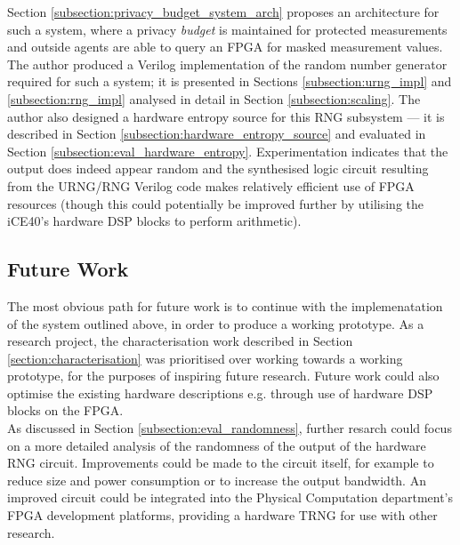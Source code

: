 \documentclass[12pt]{article}
\begin{document}
  Section \ref{subsection:privacy_budget_system_arch} proposes an architecture for such a system, where a privacy \textit{budget} is maintained for protected measurements and outside agents are able to query an FPGA for masked measurement values. The author produced a Verilog implementation of the random number generator required for such a system; it is presented in Sections \ref{subsection:urng_impl} and \ref{subsection:rng_impl} analysed in detail in Section \ref{subsection:scaling}. The author also designed a hardware entropy source for this RNG subsystem --- it is described in Section \ref{subsection:hardware_entropy_source} and evaluated in Section \ref{subsection:eval_hardware_entropy}. Experimentation indicates that the output does indeed appear random and the synthesised logic circuit resulting from the URNG/RNG Verilog code makes relatively efficient use of FPGA resources (though this could potentially be improved further by utilising the iCE40's hardware DSP blocks to perform arithmetic).


  \subsection{Future Work}
    The most obvious path for future work is to continue with the implemenatation of the system outlined above, in order to produce a working prototype. As a research project, the characterisation work described in Section \ref{section:characterisation} was prioritised over working towards a working prototype, for the purposes of inspiring future research. Future work could also optimise the existing hardware descriptions e.g. through use of hardware DSP blocks on the FPGA.\\

    As discussed in Section \ref{subsection:eval_randomness}, further resarch could focus on a more detailed analysis of the randomness of the output of the hardware RNG circuit. Improvements could be made to the circuit itself, for example to reduce size and power consumption or to increase the output bandwidth. An improved circuit could be integrated into the Physical Computation department's FPGA development platforms, providing a hardware TRNG for use with other research.\\
\end{document}
